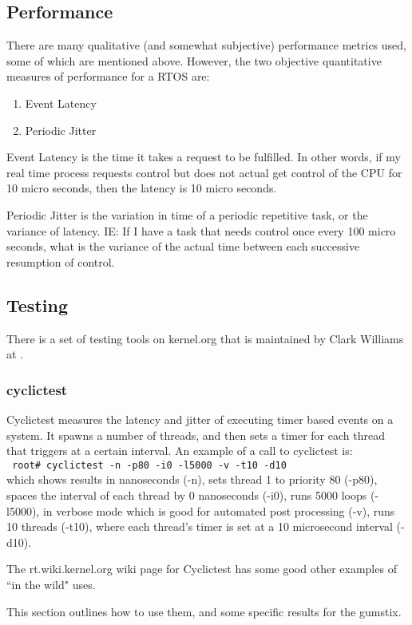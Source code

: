\documentclass{article}
\newcommand{\rootCom}[1]{\\\indent\indent\texttt{ \small root\# #1}\\}
\begin{document}
\subsection{Performance}
There are many qualitative (and somewhat subjective) performance metrics used, some of which are mentioned above.  However, the two objective quantitative measures of performance for a RTOS are:
\begin{enumerate}
\item Event Latency
\item Periodic Jitter
\end{enumerate}

Event Latency is the time it takes a request to be fulfilled.  In other words, if my real time process requests control but does not actual get control of the CPU for 10 micro seconds, then the latency is 10 micro seconds.

Periodic Jitter is the variation in time of a periodic repetitive task, or the variance of latency.  IE: If I have a task that needs control once every 100 micro seconds, what is the variance of the actual time between each successive resumption of control.

\subsection{Testing}
There is a set of testing tools on kernel.org that is maintained by Clark Williams at \cite{RTTest}.

\subsubsection{cyclictest}
Cyclictest measures the latency and jitter of executing timer based events on a system.  It spawns a number of threads, and then sets a timer for each thread that triggers at a certain interval.  An example of a call to cyclictest is: \rootCom{cyclictest -n -p80 -i0 -l5000 -v -t10 -d10}which shows results in nanoseconds (-n), sets thread 1 to priority 80 (-p80), spaces the interval of each thread by 0 nanoseconds (-i0), runs 5000 loops (-l5000), in verbose mode which is good for automated post processing (-v), runs 10 threads (-t10), where each thread's timer is set at a 10 microsecond interval (-d10).

The rt.wiki.kernel.org wiki page for Cyclictest has some good other examples of ``in the wild" uses. \cite{rtWikiCyclicTest}

This section outlines how to use them, and some specific results for the gumstix.
\end{document}
